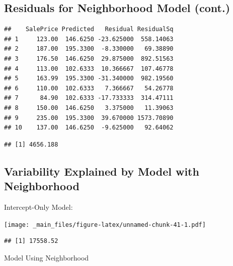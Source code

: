 \documentclass[]{book}
\newenvironment{Shaded}{\begin{snugshade}}{\end{snugshade}}
\newcommand{\KeywordTok}[1]{\textcolor[rgb]{0.13,0.29,0.53}{\textbf{#1}}}
\newcommand{\DecValTok}[1]{\textcolor[rgb]{0.00,0.00,0.81}{#1}}
\newcommand{\OperatorTok}[1]{\textcolor[rgb]{0.81,0.36,0.00}{\textbf{#1}}}
\newcommand{\NormalTok}[1]{#1}
\begin{document}
\subsection{Residuals for Neighborhood Model
(cont.)}\label{residuals-for-neighborhood-model-cont.}

\begin{verbatim}
##    SalePrice Predicted   Residual ResidualSq
## 1     123.00  146.6250 -23.625000  558.14063
## 2     187.00  195.3300  -8.330000   69.38890
## 3     176.50  146.6250  29.875000  892.51563
## 4     113.00  102.6333  10.366667  107.46778
## 5     163.99  195.3300 -31.340000  982.19560
## 6     110.00  102.6333   7.366667   54.26778
## 7      84.90  102.6333 -17.733333  314.47111
## 8     150.00  146.6250   3.375000   11.39063
## 9     235.00  195.3300  39.670000 1573.70890
## 10    137.00  146.6250  -9.625000   92.64062
\end{verbatim}

\begin{Shaded}
\end{Shaded}

\begin{verbatim}
## [1] 4656.188
\end{verbatim}

\subsection{Variability Explained by Model with
Neighborhood}\label{variability-explained-by-model-with-neighborhood}

Intercept-Only Model:

\texttt{[image: \_main\_files/figure-latex/unnamed-chunk-41-1.pdf]}

\begin{Shaded}
\end{Shaded}

\begin{verbatim}
## [1] 17558.52
\end{verbatim}

Model Using Neighborhood
\end{document}
